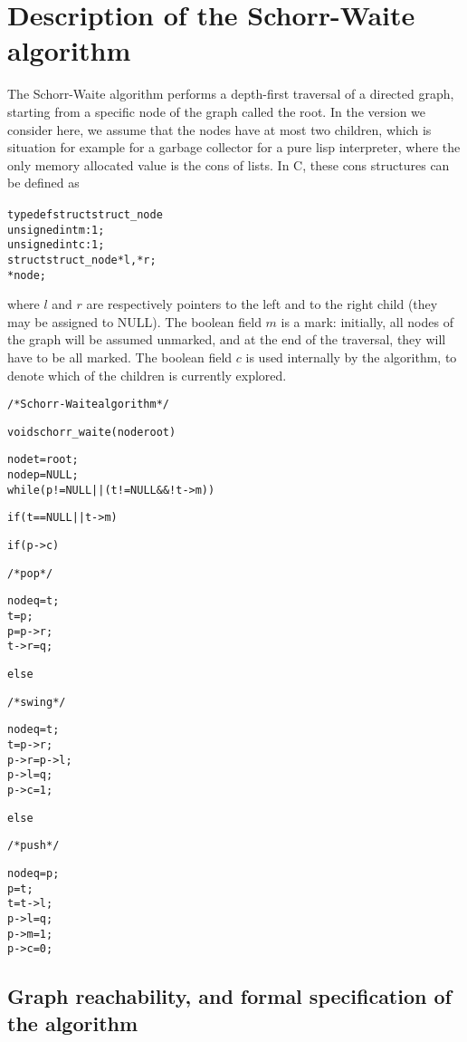
\section{Description of the Schorr-Waite algorithm}
\label{sec:algo}

The Schorr-Waite algorithm performs a depth-first traversal of a
directed graph, starting from a specific node of the graph called the
root. In the version we consider here, we assume that the nodes have
at most two children, which is situation for example for a garbage
collector for a pure lisp interpreter, where the only memory allocated value
is the \textsf{cons} of lists. In C, these \textsf{cons} structures
can be defined as
\begin{alltt}
typedef struct struct_node {
  unsigned int m :1;
  unsigned int c :1;
  struct struct_node *l, *r;
} * node;
\end{alltt}
where $l$ and $r$ are respectively pointers to the left and to the
right child (they may be assigned to NULL). The boolean field $m$ is a
mark: initially, all nodes of the graph will be assumed unmarked, and
at the end of the traversal, they will have to be all marked. The
boolean field $c$ is used internally by the algorithm, to denote which
of the children is currently explored.
 
\begin{alltt}
\begin{slshape}
/* Schorr-Waite algorithm */
\end{slshape}
void schorr_waite(node root) {
  node t = root;
  node p = NULL;
  while (p != NULL || (t != NULL && ! t->m)) {
    if (t == NULL || t->m) {
      if (p->c) {
\begin{slshape}
	/* pop */
\end{slshape}
      node q = t;
	t = p;
	p = p->r;
	t->r = q;
      } else {
\begin{slshape}
	/* swing */
\end{slshape}
      node q = t;
	t = p->r;
	p->r = p->l;
	p->l = q;
	p->c = 1;
      }
    } else {
\begin{slshape}
      /* push */
\end{slshape}
      node q = p;
      p = t;
      t = t->l;
      p->l = q;
      p->m = 1;
      p->c = 0;
    }
  }
}
\end{alltt}


\subsection{Graph reachability, and formal specification of the algorithm}

